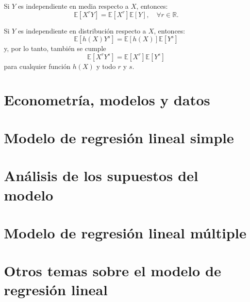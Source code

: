 \documentclass[8pt,a4paper]{extarticle}
\begin{document}
\begin{multicols}{3}
	\begin{boxprop}[]
		Si $Y$ es independiente en media respecto a $X$, entonces:
		\[
			\mathbb{E}[X^r Y] = \mathbb{E}[X^r] \mathbb{E}[Y], \quad \forall r\in \mathbb{R}
			.\]
	\end{boxprop}

	\begin{boxprop}[]
		Si $Y$ es independiente en distribución respecto a $X$, entonces:
		\[
			\mathbb{E}[h(X) Y^s] = \mathbb{E}[h(X)] \mathbb{E}[Y^s]
		\]
		y, por lo tanto, también se cumple
		\[
			\mathbb{E}[X^r Y^s] = \mathbb{E}[X^r] \mathbb{E}[Y^s]
		\]
		para cualquier función $h(X)$ y todo $r$ y $s$.
	\end{boxprop}

	\newpage
	\section{Econometría, modelos y datos}

	\newpage
	\section{Modelo de regresión lineal simple}

	\newpage
	\section{Análisis de los supuestos del modelo}

	\newpage
	\section{Modelo de regresión lineal múltiple}

	\newpage
	\section{Otros temas sobre el modelo de regresión lineal}

	\vfill\eject
	\columnbreak
\end{multicols}
\end{document}
